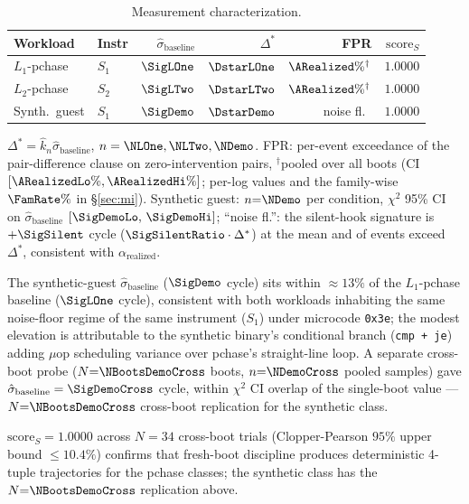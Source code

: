 \documentclass[conference]{IEEEtran}
\newcommand{\sigbase}{\hat{\sigma}_\text{baseline}}
\newcommand{\Dstar}{\Delta^{*}}
\newcommand{\arealized}{\alpha_\text{realized}}
\newcommand{\scoreS}{\text{score}_S}
\begin{document}
\begin{table}[tb]
  \caption{Measurement characterization.}
  \label{tab:meas}
  \centering
  \small
  \begin{tabular}{@{}llrrrr@{}}
  \toprule
  Workload      & Instr & $\sigbase$ & $\Dstar$    & FPR     & $\scoreS$ \\
  \midrule
  $L_1$-pchase  & $S_1$ & $\SigLOne$     & $\DstarLOne$  & $\ARealized\%^{\dagger}$ & $1.0000$ \\
  $L_2$-pchase  & $S_2$ & $\SigLTwo$     & $\DstarLTwo$  & $\ARealized\%^{\dagger}$ & $1.0000$ \\
  Synth.\ guest & $S_1$ & $\SigDemo$     & $\DstarDemo$  & noise fl.\ & $1.0000$ \\
  \bottomrule
  \end{tabular}

  \vspace{0.3em}
  \footnotesize{$\Dstar = \hat{k}_n\sigbase$, $n = \NLOne, \NLTwo, \NDemo$.
  FPR: per-event exceedance of the pair-difference clause on
  zero-intervention pairs, $^{\dagger}$pooled over all \NullBoots{}
  boots (CI $[\ARealizedLo\%, \ARealizedHi\%]$; per-log values and the
  family-wise $\FamRate\%$ in \S\ref{sec:mi}). Synthetic guest:
  $n{=}\NDemo$ per condition, $\chi^2$ 95\% CI on $\sigbase$
  $[\SigDemoLo,\,\SigDemoHi]$; ``noise fl.'': the silent-hook
  signature is $+\SigSilent$ cycle ($\SigSilentRatio\cdot\Dstar$) at
  the mean and \SilentExceed{} of \NDemo{} events exceed $\Dstar$,
  consistent with $\arealized$.}
\end{table}

The synthetic-guest $\sigbase$ ($\SigDemo$ cycle) sits within
${\approx}13\%$ of the $L_1$-pchase baseline ($\SigLOne$ cycle),
consistent with both workloads inhabiting the same noise-floor
regime of the same instrument ($S_1$) under microcode \texttt{0x3e}; the
modest elevation is attributable to the synthetic binary's
conditional branch (\texttt{cmp + je}) adding $\mu$op scheduling
variance over pchase's straight-line loop. A separate cross-boot
probe ($N{=}\NBootsDemoCross$ boots, $n{=}\NDemoCross$ pooled
samples) gave $\sigbase = \SigDemoCross$ cycle, within $\chi^2$ CI
overlap of the single-boot value --- $N{=}\NBootsDemoCross$
cross-boot replication for the synthetic class.

$\scoreS = 1.0000$ across $N{=}34$ cross-boot trials (Clopper-Pearson
$95\%$ upper bound $\leq 10.4\%$) confirms that fresh-boot discipline
produces deterministic 4-tuple trajectories for the pchase classes;
the synthetic class has the $N{=}\NBootsDemoCross$ replication above.
\end{document}
